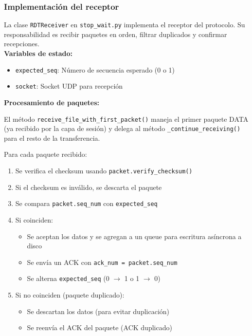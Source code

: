 \subsubsection{Implementación del receptor}

La clase \texttt{RDTReceiver} en \texttt{stop\_wait.py} implementa el receptor del protocolo. Su responsabilidad es recibir paquetes en orden, filtrar duplicados y confirmar recepciones.
\\
\textbf{Variables de estado:}
\begin{itemize}
    \item \texttt{expected\_seq}: Número de secuencia esperado (0 o 1)
    \item \texttt{socket}: Socket UDP para recepción
\end{itemize}

\textbf{Procesamiento de paquetes:}

El método \texttt{receive\_file\_with\_first\_packet()} maneja el primer paquete DATA (ya recibido por la capa de sesión) y delega al método \texttt{\_continue\_receiving()} para el resto de la transferencia. 

Para cada paquete recibido:
\begin{enumerate}
    \item Se verifica el checksum usando \texttt{packet.verify\_checksum()}
    \item Si el checksum es inválido, se descarta el paquete
    \item Se compara \texttt{packet.seq\_num} con \texttt{expected\_seq}
    \item Si coinciden:
    \begin{itemize}
        \item Se aceptan los datos y se agregan a un queue para escritura asíncrona a disco
        \item Se envía un ACK con \texttt{ack\_num = packet.seq\_num}
        \item Se alterna \texttt{expected\_seq} (0 $\rightarrow$ 1 o 1 $\rightarrow$ 0)
    \end{itemize}
    \item Si no coinciden (paquete duplicado):
    \begin{itemize}
        \item Se descartan los datos (para evitar duplicación)
        \item Se reenvía el ACK del paquete (ACK duplicado)
    \end{itemize}
\end{enumerate}

